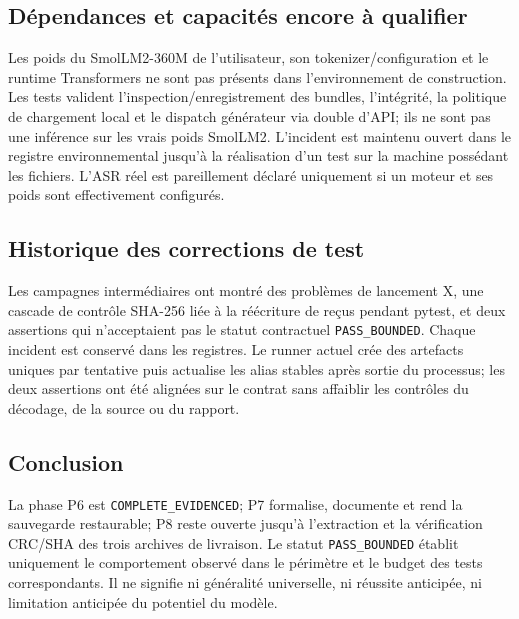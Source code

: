 \documentclass[11pt,a4paper]{article}
\begin{document}
\subsection{Dépendances et capacités encore à qualifier}
Les poids du SmolLM2-360M de l’utilisateur, son tokenizer/configuration et le runtime Transformers ne sont pas présents dans l'environnement de construction. Les tests valident l'inspection/enregistrement des bundles, l’intégrité, la politique de chargement local et le dispatch générateur via double d'API; ils ne sont pas une inférence sur les vrais poids SmolLM2. L'incident est maintenu ouvert dans le registre environnemental jusqu'à la réalisation d’un test sur la machine possédant les fichiers. L'ASR réel est pareillement déclaré uniquement si un moteur et ses poids sont effectivement configurés.

\subsection{Historique des corrections de test}
Les campagnes intermédiaires ont montré des problèmes de lancement X, une cascade de contrôle SHA-256 liée à la réécriture de reçus pendant pytest, et deux assertions qui n’acceptaient pas le statut contractuel \texttt{PASS\_BOUNDED}. Chaque incident est conservé dans les registres. Le runner actuel crée des artefacts uniques par tentative puis actualise les alias stables après sortie du processus; les deux assertions ont été alignées sur le contrat sans affaiblir les contrôles du décodage, de la source ou du rapport.

\subsection{Conclusion}
La phase P6 est \texttt{COMPLETE\_EVIDENCED}; P7 formalise, documente et rend la sauvegarde restaurable; P8 reste ouverte jusqu'à l'extraction et la vérification CRC/SHA des trois archives de livraison. Le statut \texttt{PASS\_BOUNDED} établit uniquement le comportement observé dans le périmètre et le budget des tests correspondants. Il ne signifie ni généralité universelle, ni réussite anticipée, ni limitation anticipée du potentiel du modèle.
\end{document}

